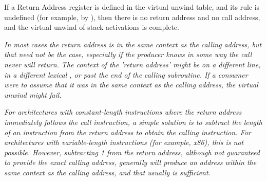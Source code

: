 If a Return Address register is defined in the virtual
unwind table, and its rule is undefined (for example, by
\DWCFAundefined), then there is no return address and no
call address, and the virtual unwind of stack activations
is complete.

\textit{In most cases the return address is in the same context as the
calling address, but that need not be the case, especially if
the producer knows in some way the call never will return. The
context of the 'return address' might be on a different line,
in a different lexical , 
or past the end of the calling
subroutine. If a consumer were to assume that it was in the
same context as the calling address, the 
virtual unwind might fail.}

\textit{For architectures with constant-length instructions where
the return address immediately follows the call instruction,
a simple solution is to subtract the length of an instruction
from the return address to obtain the calling instruction. For
architectures with variable-length instructions (for example, x86),
this is not possible. However, subtracting 1 from the return
address, although not guaranteed to provide the exact calling
address, generally will produce an address within the same
context as the calling address, and that usually is sufficient.}




